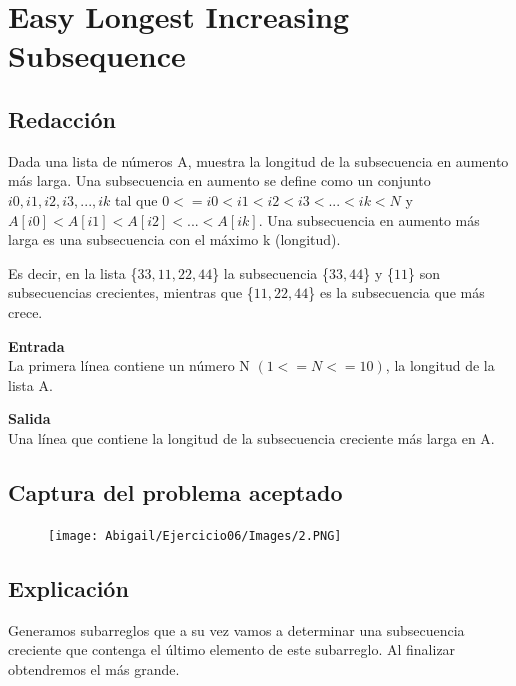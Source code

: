 \documentclass[12pt]{article}
\begin{document}
  \section{Easy Longest Increasing Subsequence}
  
    \subsection{Redacción}
        Dada una lista de números A, muestra la longitud de la subsecuencia en aumento más larga. Una subsecuencia en aumento se define como un conjunto ${i0, i1, i2, i3, ..., ik}$ tal que $0 <= i0 <i1 <i2 <i3 <... < ik < N$ y $A[i0] < A[i1] <A[i2] < ... < A[ik]$. Una subsecuencia en aumento más larga es una subsecuencia con el máximo k (longitud).

   		Es decir, en la lista \{$33, 11, 22, 44$\} la subsecuencia \{$33, 44$\} y \{$11$\} son subsecuencias crecientes, mientras que \{$11, 22, 44$\} es la subsecuencia que más crece.
        
        \begin{multicols}{2}
            \noindent\textbf{Entrada} \\ 
            La primera línea contiene un número N $(1 <= N <= 10)$, la longitud de la lista A.
            
        \columnbreak
            
            \noindent\textbf{Salida} \\
            Una línea que contiene la longitud de la subsecuencia creciente más larga en A.
        \end{multicols}
        
	 	
\newpage

    \subsection{Captura del problema aceptado}
        \begin{figure}[h!]
	        \centering
	        \texttt{[image: Abigail/Ejercicio06/Images/2.PNG]}
	 	\end{figure} 
      
    \subsection{Explicación}
    	Generamos subarreglos que a su vez vamos a determinar una subsecuencia creciente que contenga el último elemento de este subarreglo. Al finalizar obtendremos el más grande.
\end{document}
